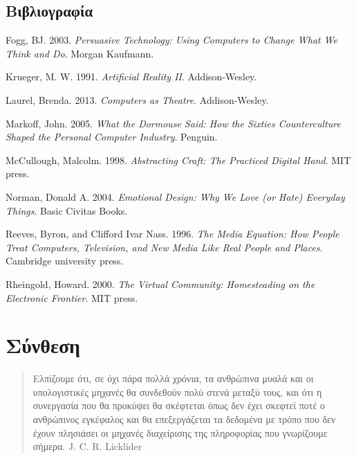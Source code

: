 \documentclass[
]{article}
\newlength{\cslhangindent}
\newlength{\cslentryspacingunit} %
\newenvironment{CSLReferences}[2] %
 {%
  \setlength{\parindent}{0pt}
  \ifodd #1
  \let\oldpar\par
  \def\par{\hangindent=\cslhangindent\oldpar}
  \fi
  \setlength{\parskip}{#2\cslentryspacingunit}
 }%
 {}
\begin{document}
\hypertarget{ux3b2ux3b9ux3b2ux3bbux3b9ux3bfux3b3ux3c1ux3b1ux3c6ux3afux3b1}{%
\subsection*{Βιβλιογραφία}\label{ux3b2ux3b9ux3b2ux3bbux3b9ux3bfux3b3ux3c1ux3b1ux3c6ux3afux3b1}}

\hypertarget{refs}{}
\begin{CSLReferences}{0}{0}
\end{CSLReferences}

Fogg, BJ. 2003. \emph{Persuasive Technology: Using Computers to Change
What We Think and Do}. Morgan Kaufmann.

Krueger, M. W. 1991. \emph{Artificial Reality II}. Addison-Wesley.

Laurel, Brenda. 2013. \emph{Computers as Theatre}. Addison-Wesley.

Markoff, John. 2005. \emph{What the Dormouse Said: How the Sixties
Counterculture Shaped the Personal Computer Industry}. Penguin.

McCullough, Malcolm. 1998. \emph{Abstracting Craft: The Practiced
Digital Hand}. MIT press.

Norman, Donald A. 2004. \emph{Emotional Design: Why We Love (or Hate)
Everyday Things}. Basic Civitas Books.

Reeves, Byron, and Clifford Ivar Nass. 1996. \emph{The Media Equation:
How People Treat Computers, Television, and New Media Like Real People
and Places.} Cambridge university press.

Rheingold, Howard. 2000. \emph{The Virtual Community: Homesteading on
the Electronic Frontier}. MIT press.

\hypertarget{ux3c3ux3cdux3bdux3b8ux3b5ux3c3ux3b7}{%
\section{Σύνθεση}\label{ux3c3ux3cdux3bdux3b8ux3b5ux3c3ux3b7}}

\begin{quote}
Ελπίζουμε ότι, σε όχι πάρα πολλά χρόνια, τα ανθρώπινα μυαλά και οι
υπολογιστικές μηχανές θα συνδεθούν πολύ στενά μεταξύ τους, και ότι η
συνεργασία που θα προκύψει θα σκέφτεται όπως δεν έχει σκεφτεί ποτέ ο
ανθρώπινος εγκέφαλος και θα επεξεργάζεται τα δεδομένα με τρόπο που δεν
έχουν πλησιάσει οι μηχανές διαχείρισης της πληροφορίας που γνωρίζουμε
σήμερα. J. C. R. Licklider
\end{quote}
\end{document}
